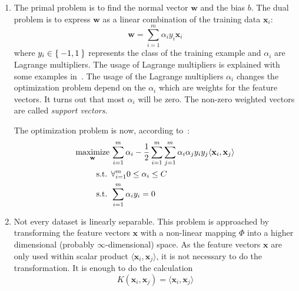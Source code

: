 \begin{enumerate}
    \item The primal problem is to find the normal vector $\mathbf{w}$ and the
          bias $b$. The dual problem is to express $\mathbf{w}$ as a linear
          combination of the training data $\mathbf{x}_i$:
          \[\mathbf{w} = \sum_{i=1}^m \alpha_i y_i \mathbf{x}_i\]
          where $y_i \in \Set{-1, 1}$ represents the class of the training
          example and $\alpha_i$ are Lagrange multipliers. The usage of
          Lagrange multipliers is explained with some examples
          in~\cite{smithlagrange}. The usage of the Lagrange multipliers
          $\alpha_i$ changes the optimization problem depend on the
          $\alpha_i$ which are weights for the feature vectors. It turns
          out that most $\alpha_i$ will be zero. The non-zero weighted vectors
          are called \textit{support vectors}.

          The optimization problem is now, according to~\cite{burges1998tutorial}:
          \begin{equation*}
          \begin{aligned}
              \operatorname*{maximize}_{\mathbf{w}}\,& \sum_{i=1}^m \alpha_i - \frac{1}{2} \sum_{i=1}^m \sum_{j=1}^m \alpha_i \alpha_j y_i y_j \langle \mathbf{x}_i, \mathbf{x}_j \rangle\\
              \text{s.t. } & \forall_{i=1}^m 0 \leq \alpha_i \leq C\\
              \text{s.t. } & \sum_{i=1}^m \alpha_i y_i = 0
          \end{aligned}
          \end{equation*}
    \item Not every dataset is linearly separable. This problem is approached
          by transforming the feature vectors $\mathbf{x}$ with a non-linear
          mapping $\Phi$ into a higher dimensional (probably
          $\infty$-dimensional) space. As the feature vectors $\mathbf{x}$
          are only used within scalar product
          $\langle \mathbf{x}_i, \mathbf{x}_j \rangle$, it is not necessary to
          do the transformation. It is enough to do the calculation
          \[K(\mathbf{x}_i, \mathbf{x}_j) = \langle \mathbf{x}_i, \mathbf{x}_j \rangle\]


\end{enumerate}
